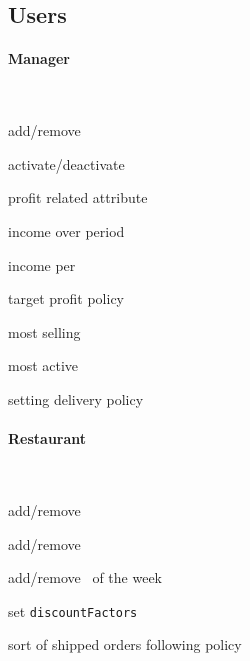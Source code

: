 
\subsection{Users} %
\label{sub:users}
\paragraph{Manager}~\vspace{0.3\baselineskip}
\begin{itemize}
  \begin{minipage}{0.47\linewidth}
    \item add/remove \User
    \item activate/deactivate \User
    \item profit related attribute
    \item income over period
    \item income per \Customer
  \end{minipage}
  \begin{minipage}{0.53\linewidth}
    \item target profit policy
    \item most selling \Restaurant
    \item most active \Courier
    \item setting delivery policy
  \end{minipage}
\end{itemize}

\paragraph*{Restaurant}~\vspace{0.3\baselineskip}
\begin{itemize}
  \begin{minipage}{0.47\linewidth}
    \item add/remove \Dish
    \item add/remove \Meal
    \item add/remove \Meal~of the week
  \end{minipage}
  \begin{minipage}{0.53\linewidth}
    \item set \lstinline|discountFactors|
    \item sort of shipped orders following policy
  \end{minipage}
\end{itemize}


